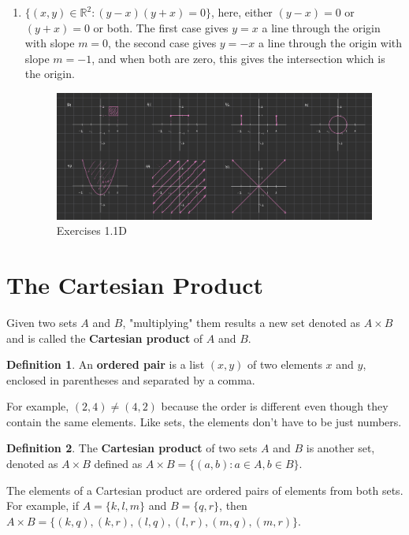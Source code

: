 \documentclass[10pt]{article}
\newcommand{\R}{\mathbb{R}}
\theoremstyle{definition}
\newtheorem{definition}{Definition}
\begin{document}
\begin{enumerate}[label=\Alph*.]
\begin{enumerate}[label=\arabic*.]
            \item $\{(x,y)\in\R^2:(y-x)(y+x)=0\}$, here, either $(y-x)=0$ or $(y+x)=0$ or both. The first case gives $y=x$ a line through the origin with slope $m=0$, the second case gives $y=-x$ a line through the origin with slope $m=-1$, and when both are zero, this gives the intersection which is the origin.
                \begin{figure}
                    \centering
                    \includegraphics[width=0.75\linewidth]{images/exercise_1_1_D.jpg}
                    \caption{Exercises 1.1D}
                \end{figure}
        \end{enumerate}
\end{enumerate}

\section{The Cartesian Product}

Given two sets $A$ and $B$, "multiplying" them results a new set denoted as $A\times B$ and is called the \textbf{Cartesian product} of $A$ and $B$.

\begin{definition}
    An \textbf{ordered pair} is a list $(x,y)$ of two elements $x$ and $y$, enclosed in parentheses and separated by a comma.
\end{definition}

For example, $(2,4) \neq (4,2)$ because the order is different even though they contain the same elements. Like sets, the elements don't have to be just numbers.

\begin{definition}
    The \textbf{Cartesian product} of two sets $A$ and $B$ is another set, denoted as $A\times B$ defined as $A \times B = \{ (a,b) : a\in A, b\in B\}$.
\end{definition}

The elements of a Cartesian product are ordered pairs of elements from both sets. For example, if $A = \{k,l,m\}$ and $B = \{q,r\}$, then $A \times B = \{(k,q),(k,r),(l,q),(l,r),(m,q),(m,r)\}$.
\end{document}
